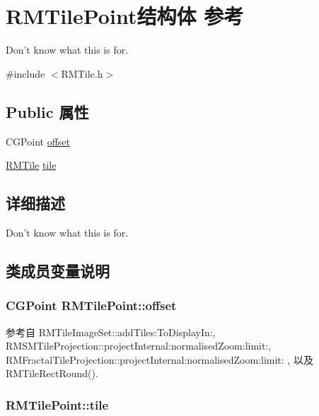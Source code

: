 \hypertarget{struct_r_m_tile_point}{\section{R\-M\-Tile\-Point结构体 参考}
\label{struct_r_m_tile_point}
}


Don't know what this is for.  




{\ttfamily \#include $<$R\-M\-Tile.\-h$>$}

\subsection*{Public 属性}
\begin{DoxyCompactItemize}
\item 
C\-G\-Point \hyperlink{struct_r_m_tile_point_a190f80ecfab41abdc38d8cd5b116f69e}{offset}
\item 
\hyperlink{struct_r_m_tile}{R\-M\-Tile} \hyperlink{struct_r_m_tile_point_a9a1f35b880c1a09314c16d6f34c53054}{tile}
\end{DoxyCompactItemize}


\subsection{详细描述}
Don't know what this is for. 

\subsection{类成员变量说明}
\hypertarget{struct_r_m_tile_point_a190f80ecfab41abdc38d8cd5b116f69e}{
\subsubsection[{offset}]{\setlength{\rightskip}{0pt plus 5cm}C\-G\-Point R\-M\-Tile\-Point\-::offset}}\label{struct_r_m_tile_point_a190f80ecfab41abdc38d8cd5b116f69e}


参考自 R\-M\-Tile\-Image\-Set\-::add\-Tiles\-:\-To\-Display\-In\-:, R\-M\-S\-M\-Tile\-Projection\-::project\-Internal\-:normalised\-Zoom\-:limit\-:, R\-M\-Fractal\-Tile\-Projection\-::project\-Internal\-:normalised\-Zoom\-:limit\-: , 以及 R\-M\-Tile\-Rect\-Round().

\hypertarget{struct_r_m_tile_point_a9a1f35b880c1a09314c16d6f34c53054}{
\subsubsection[{tile}]{ R\-M\-Tile\-Point\-::tile}}\label{struct_r_m_tile_point_a9a1f35b880c1a09314c16d6f34c53054}


